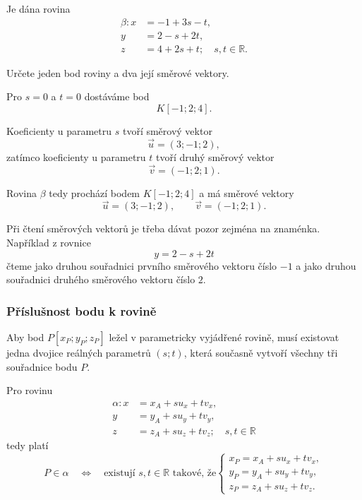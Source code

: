 \begin{example}
    \label{exa:Reading_parametric_plane}

    Je dána rovina
    \[
        \begin{aligned}
            \beta: x&=-1+3s-t,\\
            y&=2-s+2t,\\
            z&=4+2s+t; \quad s,t\in\mathbb{R}.
        \end{aligned}
    \]

    Určete jeden bod roviny a dva její směrové vektory.

    Pro $s=0$ a $t=0$ dostáváme bod
    \[
        K[-1;2;4].
    \]

    Koeficienty u parametru $s$ tvoří směrový vektor
    \[
        \vec{u}=(3;-1;2),
    \]
    zatímco koeficienty u parametru $t$ tvoří druhý směrový vektor
    \[
        \vec{v}=(-1;2;1).
    \]

    Rovina $\beta$ tedy prochází bodem $K[-1;2;4]$ a má směrové vektory
    \[
        \vec{u}=(3;-1;2),
        \qquad
        \vec{v}=(-1;2;1).
    \]
\end{example}

Při čtení směrových vektorů je třeba dávat pozor zejména na znaménka.
Například z rovnice
\[
    y=2-s+2t
\]
čteme jako druhou souřadnici prvního směrového vektoru číslo $-1$
a jako druhou souřadnici druhého směrového vektoru číslo $2$.


\subsubsection{Příslušnost bodu k rovině}
\label{subsubsec:Point_membership_parametric_plane}

Aby bod $P[x_P;y_P;z_P]$ ležel v parametricky vyjádřené rovině,
musí existovat jedna dvojice reálných parametrů $(s;t)$, která
současně vytvoří všechny tři souřadnice bodu $P$.

Pro rovinu
\[
    \begin{aligned}
        \alpha: x&=x_A+s u_x+t v_x,\\
        y&=y_A+s u_y+t v_y,\\
        z&=z_A+s u_z+t v_z; \quad s,t\in\mathbb{R}
    \end{aligned}
\]
tedy platí
\[
    P\in\alpha
    \quad\Longleftrightarrow\quad
    \text{existují }s,t\in\mathbb{R}\text{ takové, že}
    \begin{cases}
        x_P=x_A+s u_x+t v_x,\\
        y_P=y_A+s u_y+t v_y,\\
        z_P=z_A+s u_z+t v_z.
    \end{cases}
\]

